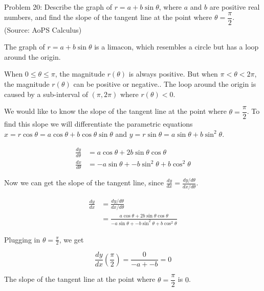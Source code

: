 Problem 20: Describe the graph of $r = a + b \sin \theta$, where $a$ and $b$ are positive real numbers, and find the slope of the tangent line at the point where $\theta = \dfrac{\pi}{2}$. (Source: AoPS Calculus)

The graph of $r = a + b \sin \theta$ is a limacon, which resembles a circle but has a loop around the origin.

When $0 \leq \theta \leq \pi$, the magnitude $r(\theta)$ is always positive. But when $\pi < \theta < 2\pi$, the magnitude $r(\theta)$ can be positive or negative.. The loop around the origin is caused by a sub-interval of $(\pi, 2\pi)$ where $r(\theta) < 0$.

We would like to know the slope of the tangent line at the point where $\theta = \dfrac{\pi}{2}$. To find this slope we will differentiate the parametric equations $x = r \cos \theta = a \cos \theta + b \cos \theta \sin \theta$ and $y = r \sin \theta = a \sin \theta + b \sin^2 \theta$.

\begin{align*}
\frac{dy}{d\theta} &= a \cos \theta + 2b \sin \theta \cos \theta \\
\frac{dx}{d\theta} &= -a \sin \theta + -b \sin^2 \theta + b \cos^2 \theta
\end{align*}

Now we can get the slope of the tangent line, since $\frac{dy}{dx} = \frac{dy/d\theta}{dx/d\theta}$.

\begin{align*}
\frac{dy}{dx} &= \frac{dy/d\theta}{dx/d\theta} \\
&= \frac{a \cos \theta + 2b \sin \theta \cos \theta}{-a \sin \theta + -b \sin^2 \theta + b \cos^2 \theta}
\end{align*}

Plugging in $\theta = \frac{\pi}{2}$, we get

$$ \frac{dy}{dx} \left( \frac{\pi}{2} \right) = \frac{0}{-a + -b} = \boxed{0} $$

The slope of the tangent line at the point where $\theta = \dfrac{\pi}{2}$ is $\boxed{0}$.
